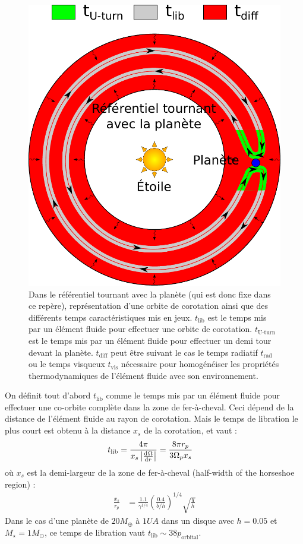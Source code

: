 \begin{figure}[htbp]
\centering
\includegraphics[width=0.75\linewidth]{figure/corotation_times.pdf}
\caption{Dans le référentiel tournant avec la planète (qui est donc fixe dans ce repère), représentation d'une orbite de corotation ainsi que des différents temps caractéristiques mis en jeux. $t_\text{lib}$ est le temps mis par un élément fluide pour effectuer une orbite de corotation. $t_\text{U-turn}$ est le temps mis par un élément fluide pour effectuer un demi tour devant la planète. $t_\text{diff}$ peut être suivant le cas le temps radiatif $t_\text{rad}$ ou le temps visqueux $t_\text{vis}$ nécessaire pour homogénéiser les propriétés thermodynamiques de l'élément fluide avec son environnement.}\label{fig:corotation_orbits}
\end{figure}

On définit tout d'abord $t_\text{lib}$ comme le temps mis par un élément fluide pour effectuer une co-orbite complète dans la zone de fer-à-cheval. Ceci dépend de la distance de l'élément fluide au rayon de corotation. Mais le temps de libration le plus court est obtenu à la distance $x_s$ de la corotation, et vaut \citep[eq. (52)]{baruteau2008corotation} : 
\begin{align}
t_\text{lib} &= \frac{4\pi}{x_s\abs{\od{\Omega}{r}}} = \frac{8\pi r_p}{3\Omega_p x_s}
\end{align}
où $x_s$ est la demi-largeur de la zone de fer-à-cheval (\og half-width of the horseshoe region\fg) \citep[eq. (44)]{paardekooper2010torque} :
\begin{align}
\frac{x_s}{r_p} &= \frac{1.1}{\gamma^{1/4}} \left(\frac{0.4}{b/h}\right)^{1/4} \sqrt{\frac{q}{h}}
\end{align}
Dans le cas d'une planète de $20\unit{M_\oplus}$ à $1\unit{UA}$ dans un disque avec $h=0.05$ et $M_\star=1M_\odot$, ce temps de libration vaut $t_\text{lib}\sim 38 p_\text{orbital}$. 

